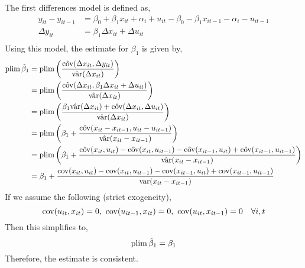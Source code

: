\documentclass[12pt,twoside]{article}
\begin{document}
\begin{problems}
\begin{problemparts}
\problempart %

The first differences model is defined as,
\begin{align*}
    y_{it} - y_{it - 1} &= \beta_0 + \beta_1 x_{it} + \alpha_i + u_{it} - \beta_0 - \beta_1 x_{it - 1} - \alpha_i - u_{it-1} \\
    \Delta y_{it} &= \beta_1 \Delta x_{it} + \Delta u_{it} \\
\end{align*}
Using this model, the estimate for $\beta_1$ is given by,
\begin{align*}
    \operatorname{plim} \hat{\beta}_1 &= \operatorname{plim}\left(\frac{\hat{\operatorname{cov}}(\Delta x_{it}, \Delta
    y_{it})}{\hat{\operatorname{var}}(\Delta x_{it})}\right) \\
    &= \operatorname{plim} \left(\frac{\hat{\operatorname{cov}}(\Delta x_{it}, \beta_1 \Delta x_{it} +
    \Delta u_{it})}{\hat{\operatorname{var}}(\Delta x_{it})} \right)\\
    &= \operatorname{plim} \left(\frac{\beta_1 \hat{\operatorname{var}}(\Delta x_{it}) +
    \hat{\operatorname{cov}}(\Delta x_{it}, \Delta u_{it})}{\hat{\operatorname{var}}(\Delta x_{it})}
    \right)\\
    &= \operatorname{plim} \left(\beta_1 + \frac{\hat{\operatorname{cov}}(x_{it} - x_{it-1}, u_{it} -
    u_{it-1})}{\hat{\operatorname{var}}(x_{it} - x_{it-1})}\right) \\
    &= \operatorname{plim} \left(\beta_1 + \frac{\hat{\operatorname{cov}}(x_{it}, u_{it}) -
    \hat{\operatorname{cov}}(x_{it}, u_{it-1}) - \hat{\operatorname{cov}}(x_{it-1},u_{it}) +
    \hat{\operatorname{cov}}(x_{it-1},u_{it-1})}{\hat{\operatorname{var}}(x_{it} - x_{it-1})}\right) \\
    &= \beta_1 + \frac{\operatorname{cov}(x_{it}, u_{it}) - \operatorname{cov}(x_{it}, u_{it-1})
    -\operatorname{cov}(x_{it-1},u_{it}) + \operatorname{cov}(x_{it-1},u_{it-1})}{\operatorname{var}(x_{it} -
    x_{it-1})} \\
\end{align*}
If we assume the following (strict exogeneity),
$$\operatorname{cov}(u_{it}, x_{it}) = 0,\ \operatorname{cov}(u_{it-1}, x_{it}) = 0,\ \operatorname{cov}(u_{it},
x_{it-1}) = 0\quad \forall i, t $$
Then this simplifies to,
$$ \operatorname{plim} \hat{\beta}_1 = \beta_1 $$
Therefore, the estimate is consistent.

\problempart %


\end{problemparts}
\end{problems}
\end{document}
